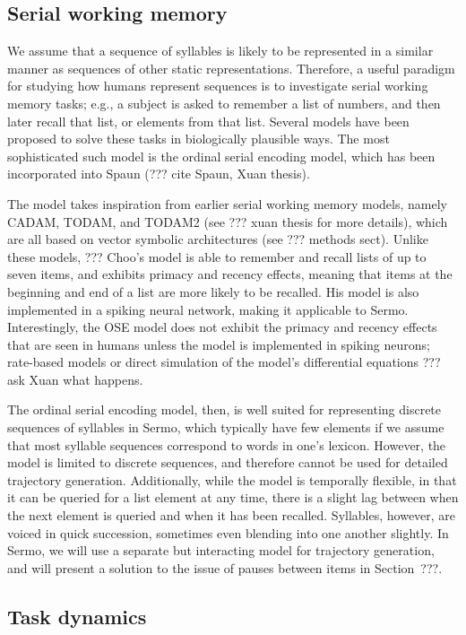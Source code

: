 \subsection{Serial working memory}

We assume that a sequence of syllables
is likely to be represented
in a similar manner
as sequences of other static representations.
Therefore, a useful paradigm for studying
how humans represent sequences
is to investigate serial working memory tasks;
e.g., a subject is asked to remember
a list of numbers,
and then later recall that list,
or elements from that list.
Several models have been proposed
to solve these tasks
in biologically plausible ways.
The most sophisticated such model
is the ordinal serial encoding model,
which has been incorporated into
Spaun (??? cite Spaun, Xuan thesis).

The model takes inspiration from
earlier serial working memory models,
namely CADAM, TODAM, and TODAM2
(see ??? xuan thesis for more details),
which are all based on
vector symbolic architectures
(see ??? methods sect).
Unlike these models,
??? Choo's model
is able to remember and recall
lists of up to seven items,
and exhibits primacy and recency effects,
meaning that items at the beginning
and end of a list are more likely
to be recalled.
His model is also implemented
in a spiking neural network,
making it applicable to Sermo.
Interestingly,
the OSE model does not exhibit
the primacy and recency effects
that are seen in humans
unless the model
is implemented in spiking neurons;
rate-based models or direct simulation
of the model's differential equations
??? ask Xuan what happens.

The ordinal serial encoding model,
then, is well suited for representing
discrete sequences of syllables in Sermo,
which typically have few elements
if we assume that most syllable sequences
correspond to words in one's lexicon.
However, the model is limited to
discrete sequences,
and therefore cannot be used
for detailed trajectory generation.
Additionally,
while the model is temporally flexible,
in that it can be queried for
a list element at any time,
there is a slight lag between
when the next element is queried
and when it has been recalled.
Syllables, however, are voiced in quick succession,
sometimes even blending into one another slightly.
In Sermo, we will use a separate but interacting model
for trajectory generation,
and will present a solution
to the issue of pauses between items
in Section~???.

\subsection{Task dynamics}

